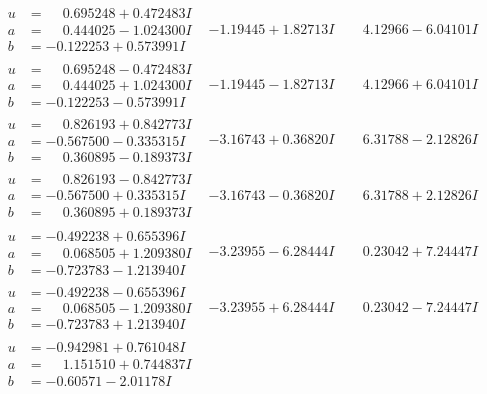 \documentclass[1p]{elsarticle_modified}
\theoremstyle{definition}
\begin{document}
$$\begin{array}{c|c|c}
\begin{aligned}
u &= \phantom{-}0.695248 + 0.472483 I \\
a &= \phantom{-}0.444025 - 1.024300 I \\
b &= -0.122253 + 0.573991 I\end{aligned}
 & -1.19445 + 1.82713 I & \phantom{-}4.12966 - 6.04101 I \\ \hline\begin{aligned}
u &= \phantom{-}0.695248 - 0.472483 I \\
a &= \phantom{-}0.444025 + 1.024300 I \\
b &= -0.122253 - 0.573991 I\end{aligned}
 & -1.19445 - 1.82713 I & \phantom{-}4.12966 + 6.04101 I \\ \hline\begin{aligned}
u &= \phantom{-}0.826193 + 0.842773 I \\
a &= -0.567500 - 0.335315 I \\
b &= \phantom{-}0.360895 - 0.189373 I\end{aligned}
 & -3.16743 + 0.36820 I & \phantom{-}6.31788 - 2.12826 I \\ \hline\begin{aligned}
u &= \phantom{-}0.826193 - 0.842773 I \\
a &= -0.567500 + 0.335315 I \\
b &= \phantom{-}0.360895 + 0.189373 I\end{aligned}
 & -3.16743 - 0.36820 I & \phantom{-}6.31788 + 2.12826 I \\ \hline\begin{aligned}
u &= -0.492238 + 0.655396 I \\
a &= \phantom{-}0.068505 + 1.209380 I \\
b &= -0.723783 - 1.213940 I\end{aligned}
 & -3.23955 - 6.28444 I & \phantom{-}0.23042 + 7.24447 I \\ \hline\begin{aligned}
u &= -0.492238 - 0.655396 I \\
a &= \phantom{-}0.068505 - 1.209380 I \\
b &= -0.723783 + 1.213940 I\end{aligned}
 & -3.23955 + 6.28444 I & \phantom{-}0.23042 - 7.24447 I \\ \hline\begin{aligned}
u &= -0.942981 + 0.761048 I \\
a &= \phantom{-}1.151510 + 0.744837 I \\
b &= -0.60571 - 2.01178 I\end{aligned}

\end{array}$$
\end{document}
